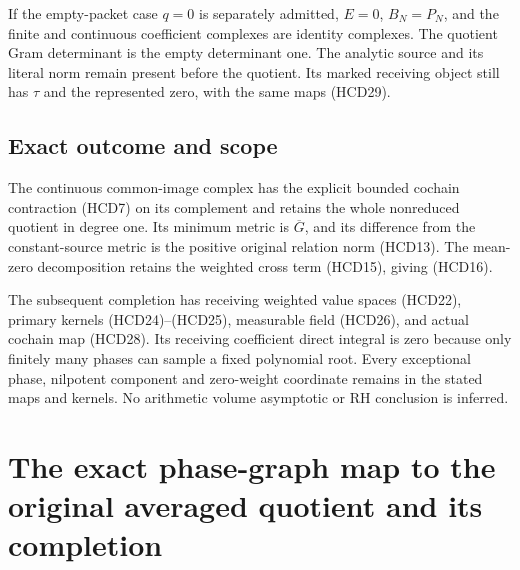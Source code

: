 \documentclass[11pt,a4paper]{article}
\theoremstyle{definition}
\begin{document}
If the empty-packet case $q=0$ is separately admitted,
$E=0$, $B_N=P_N$, and the finite and continuous coefficient
complexes are identity complexes. The quotient Gram
determinant is the empty determinant one. The analytic
source and its literal norm remain present before the
quotient. Its marked receiving object still has $\tau$
and the represented zero, with the same maps (HCD29).

\subsection{Exact outcome and scope}

The continuous common-image complex has the explicit bounded
cochain contraction (HCD7) on its complement and retains
the whole nonreduced quotient in degree one.
Its minimum metric is $\overline G$, and its difference
from the constant-source metric is the positive original
relation norm (HCD13). The mean-zero decomposition retains
the weighted cross term (HCD15), giving (HCD16).

The subsequent completion has receiving weighted value
spaces (HCD22), primary kernels (HCD24)--(HCD25), measurable
field (HCD26), and actual cochain map (HCD28).
Its receiving coefficient direct integral is zero because
only finitely many phases can sample a fixed polynomial root.
Every exceptional phase, nilpotent component and zero-weight
coordinate remains in the stated maps and kernels.
No arithmetic volume asymptotic or RH conclusion is inferred.


\endgroup



\section{The exact phase-graph map to the original averaged quotient and its completion}
\label{sec:pgb-averaged-bridge}
\end{document}
